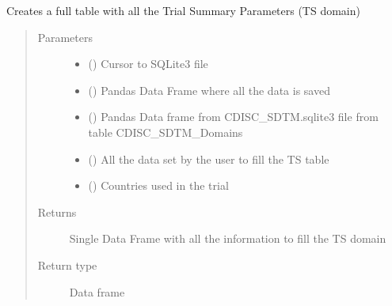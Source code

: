 \documentclass[letterpaper,10pt,english]{sphinxmanual}
\begin{document}
\begin{fulllineitems}
\label{\detokenize{CE_app.synth_trial:CE_app.synth_trial.functions.func_nihpo_create_TS_domain}}
\sphinxAtStartPar
Creates a full table with all the Trial Summary Parameters (TS domain)
\begin{quote}\begin{description}
\item[{Parameters}] \leavevmode\begin{itemize}
\item {} 
\sphinxAtStartPar
{} () \textendash{} Cursor to SQLite3 file

\item {} 
\sphinxAtStartPar
{} () \textendash{} Pandas Data Frame where all the data is saved

\item {} 
\sphinxAtStartPar
{} () \textendash{} Pandas Data frame from CDISC\_SDTM.sqlite3 file from table CDISC\_SDTM\_Domains

\item {} 
\sphinxAtStartPar
{} () \textendash{} All the data set by the user to fill the TS table

\item {} 
\sphinxAtStartPar
{} () \textendash{} Countries used in the trial

\end{itemize}

\item[{Returns}] \leavevmode
\sphinxAtStartPar
Single Data Frame with all the information to fill the TS domain

\item[{Return type}] \leavevmode
\sphinxAtStartPar
Data frame

\end{description}\end{quote}

\end{fulllineitems}
\end{document}
